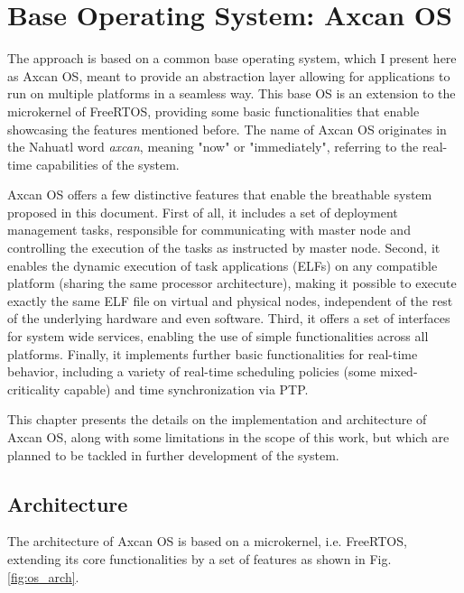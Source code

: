 
\chapter{Base Operating System: Axcan OS}\label{chap:os}

The approach is based on a common base operating system, which I present here as Axcan OS, meant to provide an abstraction layer allowing for applications to run on multiple platforms in a seamless way. This base OS is an extension to the microkernel of FreeRTOS, providing some basic functionalities that enable showcasing the features mentioned before. The name of Axcan OS originates in the Nahuatl word \textit{axcan}, meaning "now" or "immediately", referring to the real-time capabilities of the system.

Axcan OS offers a few distinctive features that enable the breathable system proposed in this document. First of all, it includes a set of deployment management tasks, responsible for communicating with master node and controlling the execution of the tasks as instructed by master node. Second, it enables the dynamic execution of task applications (ELFs) on any compatible platform (sharing the same processor architecture), making it possible to execute exactly the same ELF file on virtual and physical nodes, independent of the rest of the underlying hardware and even software. Third, it offers a set of interfaces for system wide services, enabling the use of simple functionalities across all platforms. Finally, it implements further basic functionalities for real-time behavior, including a variety of real-time scheduling policies (some mixed-criticality capable) and time synchronization via PTP.

This chapter presents the details on the implementation and architecture of Axcan OS, along with some limitations in the scope of this work, but which are planned to be tackled in further development of the system.

\section{Architecture}
The architecture of Axcan OS is based on a microkernel, i.e. FreeRTOS, extending its core functionalities by a set of features as shown in Fig. \ref{fig:os_arch}.


